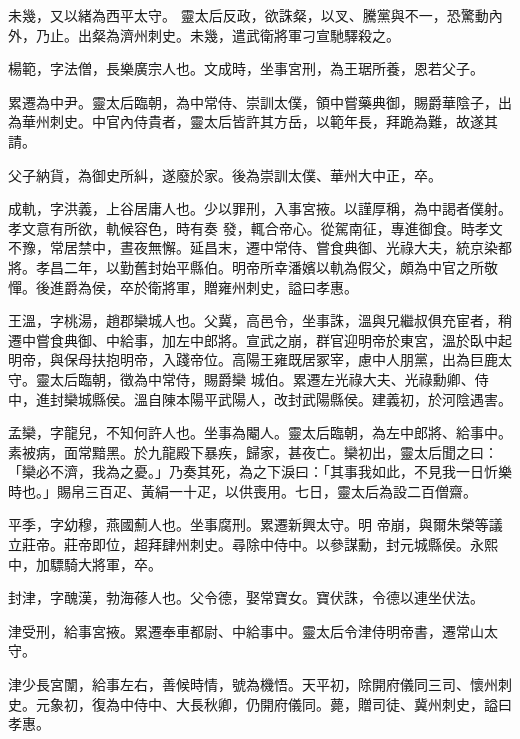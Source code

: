\begin{pinyinscope}
 未幾，又以緒為西平太守。
 靈太后反政，欲誅粲，以叉、騰黨與不一，恐驚動內外，乃止。出粲為濟州刺史。未幾，遣武衛將軍刁宣馳驛殺之。



 楊範，字法僧，長樂廣宗人也。文成時，坐事宮刑，為王琚所養，恩若父子。



 累遷為中尹。靈太后臨朝，為中常侍、崇訓太僕，領中嘗藥典御，賜爵華陰子，出為華州刺史。中官內侍貴者，靈太后皆許其方岳，以範年長，拜跪為難，故遂其請。



 父子納貨，為御史所糾，遂廢於家。後為崇訓太僕、華州大中正，卒。



 成軌，字洪義，上谷居庸人也。少以罪刑，入事宮掖。以謹厚稱，為中謁者僕射。孝文意有所欲，軌候容色，時有奏
 發，輒合帝心。從駕南征，專進御食。時孝文不豫，常居禁中，晝夜無懈。延昌末，遷中常侍、嘗食典御、光祿大夫，統京染都將。孝昌二年，以勤舊封始平縣伯。明帝所幸潘嬪以軌為假父，頗為中官之所敬憚。後進爵為侯，卒於衛將軍，贈雍州刺史，謚曰孝惠。



 王溫，字桃湯，趙郡欒城人也。父冀，高邑令，坐事誅，溫與兄繼叔俱充宦者，稍遷中嘗食典御、中給事，加左中郎將。宣武之崩，群官迎明帝於東宮，溫於臥中起明帝，與保母扶抱明帝，入踐帝位。高陽王雍既居冢宰，慮中人朋黨，出為巨鹿太守。靈太后臨朝，徵為中常侍，賜爵欒
 城伯。累遷左光祿大夫、光祿勳卿、侍中，進封欒城縣侯。溫自陳本陽平武陽人，改封武陽縣侯。建義初，於河陰遇害。



 孟欒，字龍兒，不知何許人也。坐事為閹人。靈太后臨朝，為左中郎將、給事中。素被病，面常黯黑。於九龍殿下暴疾，歸家，甚夜亡。欒初出，靈太后聞之曰：「欒必不濟，我為之憂。」乃奏其死，為之下淚曰：「其事我如此，不見我一日忻樂時也。」賜帛三百疋、黃絹一十疋，以供喪用。七日，靈太后為設二百僧齋。



 平季，字幼穆，燕國薊人也。坐事腐刑。累遷新興太守。明
 帝崩，與爾朱榮等議立莊帝。莊帝即位，超拜肆州刺史。尋除中侍中。以參謀勳，封元城縣侯。永熙中，加驃騎大將軍，卒。



 封津，字醜漢，勃海蓚人也。父令德，娶常寶女。寶伏誅，令德以連坐伏法。



 津受刑，給事宮掖。累遷奉車都尉、中給事中。靈太后令津侍明帝書，遷常山太守。



 津少長宮闈，給事左右，善候時情，號為機悟。天平初，除開府儀同三司、懷州刺史。元象初，復為中侍中、大長秋卿，仍開府儀同。薨，贈司徒、冀州刺史，謚曰孝惠。




\end{pinyinscope}
